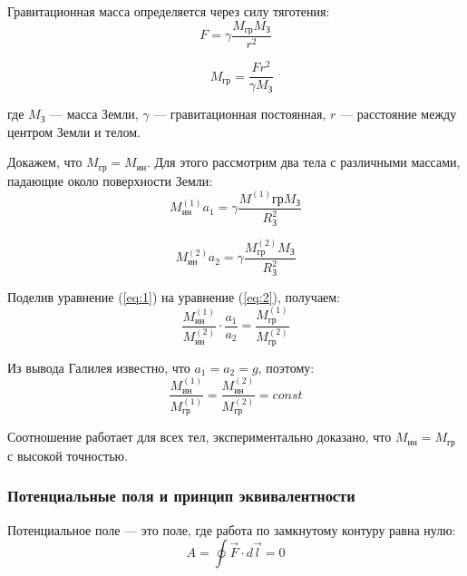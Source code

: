 Гравитационная масса определяется через силу тяготения:
\begin{equation}
   F = \gamma \frac{M_{\text{гр}} M_{\text{З}}}{r^2}
\end{equation}

\begin{equation}
   \quad M_{\text{гр}} = \frac{F r^2}{\gamma M_{\text{З}}}
\end{equation}

где $M_{\text{З}}$ — масса Земли, $\gamma$ — гравитационная постоянная, $r$ — расстояние между центром Земли и телом.

Докажем, что $M_{\text{гр}} = M_{\text{ин}}$. Для этого рассмотрим два тела с различными массами, падающие около поверхности Земли:
\begin{equation}
\label{eq:1}
   M^{(1)}_{\text{ин}}a_1 = \gamma \frac{M^{(1)}{\text{гр}}M_{\text{З}}}{R^2_{\text{З}}}
\end{equation}

\begin{equation}
\label{eq:2}
   M^{(2)}_{\text{ин}}a_2 = \gamma \frac{M^{(2)}_{\text{гр}}M_{\text{З}}}{R^2_{\text{З}}}
\end{equation}

Поделив уравнение (\ref{eq:1}) на уравнение (\ref{eq:2}), получаем:
\begin{equation}
   \frac{M_{\text{ин}}^{(1)}}{M_{\text{ин}}^{(2)}} \cdot\frac{a_1}{a_2} = \frac{M_{\text{гр}}^{(1)}}{M_{\text{гр}}^{(2)}}
\end{equation}

Из вывода Галилея известно, что $a_1 = a_2 = g$, поэтому:
\begin{equation}
\label{eq:3}
   \frac{M_{\text{ин}}^{(1)}}{M_{\text{гр}}^{(1)}} = \frac{M_{\text{ин}}^{(2)}}{M_{\text{гр}}^{(2)}} = const
\end{equation}

Соотношение работает для всех тел, экспериментально доказано, что $M_{\text{ин}} = M_{\text{гр}}$ с высокой точностью.

\subsubsection{Потенциальные поля и принцип эквивалентности}

Потенциальное поле — это поле, где работа по замкнутому контуру равна нулю:
\begin{equation}
\label{eq:4}
   A = \oint \vec{F} \cdot d\vec{l} = 0
\end{equation}

